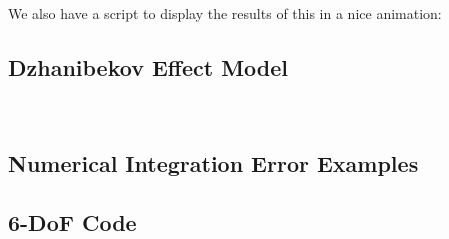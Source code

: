\documentclass[12pt]{report}
\begin{document}
We also have a script to display the results of this in a nice animation:

\label{code:LorenzAnim}
\subsection{Dzhanibekov Effect Model}
\label{code:DzhanMain}

\label{code:DzhanInt}

\label{code:DzhanRotVis}\


\subsection{Numerical Integration Error Examples}
\label{code:Numerical Error $y'=2t$}

\label{code:Numerical Error y'=cos(4*pi*t)}
\subsection{6-DoF Code}
\label{code:mainRK4}

\label{code:6DoF Integrator}

\printglossary[title=Special Terms, toctitle = Special Terms]

\printbibliography[heading=bibintoc, title={References}]
\end{document}
